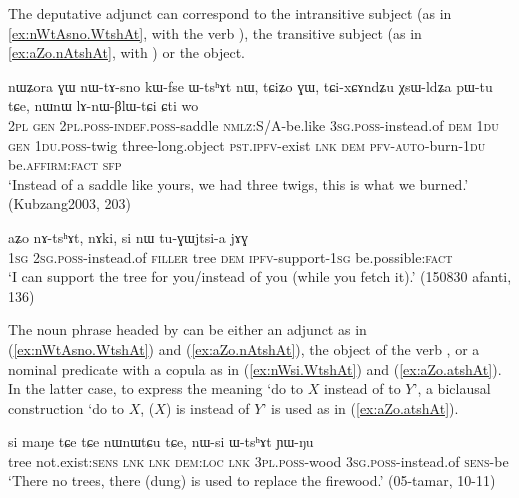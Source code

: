 The deputative adjunct can correspond to the intransitive subject (as in \ref{ex:nWtAsno.WtshAt}, with the verb ), the transitive subject (as in \ref{ex:aZo.nAtshAt}, with ) or the object.

\begin{exe}
\ex \label{ex:nWtAsno.WtshAt}
\gll nɯʑora ɣɯ nɯ-tɤ-sno kɯ-fse ɯ-tsʰɤt nɯ, tɕiʑo ɣɯ, tɕi-xɕɤndʑu χsɯ-ldʑa pɯ-tu tɕe, nɯnɯ lɤ-nɯ-βlɯ-tɕi ɕti wo \\
\textsc{2pl} \textsc{gen} \textsc{2pl}.\textsc{poss}-\textsc{indef}.\textsc{poss}-saddle \textsc{nmlz}:S/A-be.like \textsc{3sg}.\textsc{poss}-instead.of \textsc{dem} \textsc{1du} \textsc{gen} \textsc{1du}.\textsc{poss}-twig three-long.object \textsc{pst}.\textsc{ipfv}-exist \textsc{lnk} \textsc{dem} \textsc{pfv}-\textsc{auto}-burn-\textsc{1du} be.\textsc{affirm}:\textsc{fact} \textsc{sfp} \\
\glt `Instead of a saddle like yours, we had three twigs, this is what we burned.' (Kubzang2003, 203)
\end{exe}

\begin{exe}
\ex \label{ex:aZo.nAtshAt}
\gll aʑo nɤ-tsʰɤt, nɤki, si nɯ tu-ɣɯjtsi-a jɤɣ \\
\textsc{1sg} \textsc{2sg}.\textsc{poss}-instead.of \textsc{filler} tree \textsc{dem} \textsc{ipfv}-support-\textsc{1sg} be.possible:\textsc{fact} \\
\glt `I can support the tree for you/instead of you (while you fetch it).' (150830 afanti, 136)
\end{exe}

 The noun phrase headed by  can be either an adjunct as in (\ref{ex:nWtAsno.WtshAt}) and (\ref{ex:aZo.nAtshAt}), the object of the verb , or a nominal predicate with a copula as in (\ref{ex:nWsi.WtshAt}) and (\ref{ex:aZo.atshAt}).  In the latter case, to express the meaning `do to $X$ instead of to $Y$', a biclausal construction `do to $X$, ($X$) is instead of $Y$' is used as in (\ref{ex:aZo.atshAt}).

\begin{exe}
\ex \label{ex:nWsi.WtshAt}
\gll si maŋe tɕe tɕe nɯnɯtɕu tɕe, nɯ-si ɯ-tsʰɤt ɲɯ-ŋu  \\
tree not.exist:\textsc{sens} \textsc{lnk} \textsc{lnk} \textsc{dem}:\textsc{loc} \textsc{lnk} \textsc{3pl}.\textsc{poss}-wood \textsc{3sg}.\textsc{poss}-instead.of \textsc{sens}-be \\
\glt `There no trees, there (dung) is used to replace the firewood.' (05-tamar, 10-11)
\end{exe}


